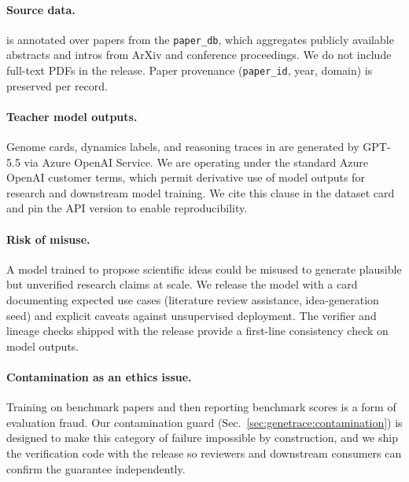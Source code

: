 \paragraph{Source data.} \genetrace{} is annotated over papers from the
\ideaevolving{} \texttt{paper\_db}, which aggregates publicly available
abstracts and intros from ArXiv and conference proceedings. We do not
include full-text PDFs in the release. Paper provenance (\texttt{paper\_id},
year, domain) is preserved per record.

\paragraph{Teacher model outputs.} Genome cards, dynamics labels, and
reasoning traces in \genetrace{} are generated by GPT-5.5 via Azure
OpenAI Service. We are operating under the standard Azure OpenAI
customer terms, which permit derivative use of model outputs for
research and downstream model training. We cite this clause in the
dataset card and pin the API version to enable reproducibility.

\paragraph{Risk of misuse.} A model trained to propose scientific ideas
could be misused to generate plausible but unverified research claims at
scale. We release the model with a card documenting expected use cases
(literature review assistance, idea-generation seed) and explicit
caveats against unsupervised deployment. The verifier and lineage
checks shipped with the release provide a first-line consistency check
on model outputs.

\paragraph{Contamination as an ethics issue.} Training on benchmark
papers and then reporting benchmark scores is a form of evaluation
fraud. Our contamination guard (Sec.~\ref{sec:genetrace:contamination})
is designed to make this category of failure impossible by construction,
and we ship the verification code with the release so reviewers and
downstream consumers can confirm the guarantee independently.

